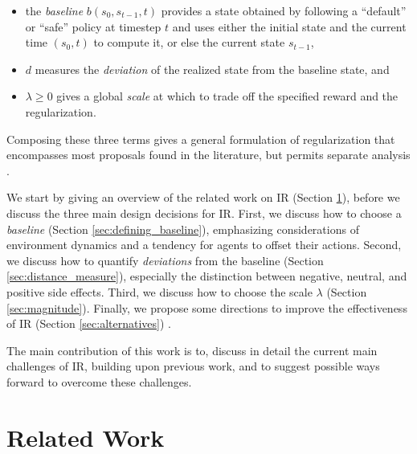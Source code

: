 \documentclass[letterpaper]{article} %
\begin{document}
\begin{itemize}
\item the \emph{baseline} $b(s_0, s_{t-1}, t)$ provides a state obtained by following a ``default'' or ``safe'' policy at timestep $t$ and uses either the initial state and the current time $(s_0, t)$ to compute it, or else the current state $s_{t-1}$,
\item $d$ measures the \emph{deviation}
of the realized state from the baseline state, and 
\item  $\lambda \ge 0$ gives a global \emph{scale} at which to trade off the specified reward and the regularization.
\end{itemize}
Composing these three terms gives a general formulation of regularization that encompasses most proposals found in the literature, but permits separate analysis \citep{krakovna2018penalizing}.

We start by giving an overview of the related work on IR (Section \ref{sec:related_work}), before we discuss the three main design decisions for IR.  First, we discuss how to choose a \emph{baseline} (Section \ref{sec:defining_baseline}), emphasizing considerations of environment dynamics and a tendency for agents to offset their actions. 
Second, we discuss how to quantify \emph{deviations} from the baseline (Section \ref{sec:distance_measure}), especially the distinction between negative, neutral, and positive side effects. Third, we discuss how to choose the scale $\lambda$ (Section \ref{sec:magnitude}). Finally, we propose some directions to improve the effectiveness of IR (Section \ref{sec:alternatives}) .

The main contribution of this work is to, discuss in detail the current main challenges of IR, building upon previous work, and to suggest possible ways forward to overcome these challenges.

\section{Related Work}
\label{sec:related_work}
\end{document}
